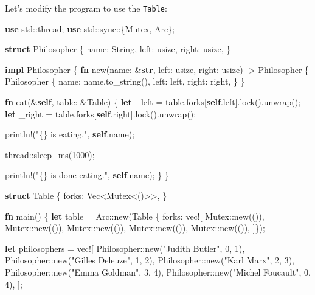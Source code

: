 \documentclass[a4paper,]{book}
\newenvironment{Shaded}{\begin{snugshade}}{\end{snugshade}}
\newcommand{\KeywordTok}[1]{\textcolor[rgb]{0.13,0.29,0.53}{\textbf{{#1}}}}
\newcommand{\DecValTok}[1]{\textcolor[rgb]{0.00,0.00,0.81}{{#1}}}
\newcommand{\StringTok}[1]{\textcolor[rgb]{0.31,0.60,0.02}{{#1}}}
\newcommand{\OtherTok}[1]{\textcolor[rgb]{0.56,0.35,0.01}{{#1}}}
\newcommand{\NormalTok}[1]{{#1}}
\begin{document}
Let's modify the program to use the \texttt{Table}:

\begin{Shaded}
\begin{Highlighting}[]
\KeywordTok{use} \NormalTok{std::thread;}
\KeywordTok{use} \NormalTok{std::sync::\{Mutex, Arc\};}

\KeywordTok{struct} \NormalTok{Philosopher \{}
    \NormalTok{name: String,}
    \NormalTok{left: usize,}
    \NormalTok{right: usize,}
\NormalTok{\}}

\KeywordTok{impl} \NormalTok{Philosopher \{}
    \KeywordTok{fn} \NormalTok{new(name: &}\KeywordTok{str}\NormalTok{, left: usize, right: usize) -> Philosopher \{}
        \NormalTok{Philosopher \{}
            \NormalTok{name: name.to_string(),}
            \NormalTok{left: left,}
            \NormalTok{right: right,}
        \NormalTok{\}}
    \NormalTok{\}}

    \KeywordTok{fn} \NormalTok{eat(&}\KeywordTok{self}\NormalTok{, table: &Table) \{}
        \KeywordTok{let} \NormalTok{_left = table.forks[}\KeywordTok{self}\NormalTok{.left].lock().unwrap();}
        \KeywordTok{let} \NormalTok{_right = table.forks[}\KeywordTok{self}\NormalTok{.right].lock().unwrap();}

        \OtherTok{println!}\NormalTok{(}\StringTok{"\{\} is eating."}\NormalTok{, }\KeywordTok{self}\NormalTok{.name);}

        \NormalTok{thread::sleep_ms(}\DecValTok{1000}\NormalTok{);}

        \OtherTok{println!}\NormalTok{(}\StringTok{"\{\} is done eating."}\NormalTok{, }\KeywordTok{self}\NormalTok{.name);}
    \NormalTok{\}}
\NormalTok{\}}

\KeywordTok{struct} \NormalTok{Table \{}
    \NormalTok{forks: Vec<Mutex<()>>,}
\NormalTok{\}}

\KeywordTok{fn} \NormalTok{main() \{}
    \KeywordTok{let} \NormalTok{table = Arc::new(Table \{ forks: }\OtherTok{vec!}\NormalTok{[}
        \NormalTok{Mutex::new(()),}
        \NormalTok{Mutex::new(()),}
        \NormalTok{Mutex::new(()),}
        \NormalTok{Mutex::new(()),}
        \NormalTok{Mutex::new(()),}
    \NormalTok{]\});}

    \KeywordTok{let} \NormalTok{philosophers = }\OtherTok{vec!}\NormalTok{[}
        \NormalTok{Philosopher::new(}\StringTok{"Judith Butler"}\NormalTok{, }\DecValTok{0}\NormalTok{, }\DecValTok{1}\NormalTok{),}
        \NormalTok{Philosopher::new(}\StringTok{"Gilles Deleuze"}\NormalTok{, }\DecValTok{1}\NormalTok{, }\DecValTok{2}\NormalTok{),}
        \NormalTok{Philosopher::new(}\StringTok{"Karl Marx"}\NormalTok{, }\DecValTok{2}\NormalTok{, }\DecValTok{3}\NormalTok{),}
        \NormalTok{Philosopher::new(}\StringTok{"Emma Goldman"}\NormalTok{, }\DecValTok{3}\NormalTok{, }\DecValTok{4}\NormalTok{),}
        \NormalTok{Philosopher::new(}\StringTok{"Michel Foucault"}\NormalTok{, }\DecValTok{0}\NormalTok{, }\DecValTok{4}\NormalTok{),}
    \NormalTok{];}


\end{Highlighting}
\end{Shaded}
\end{document}
